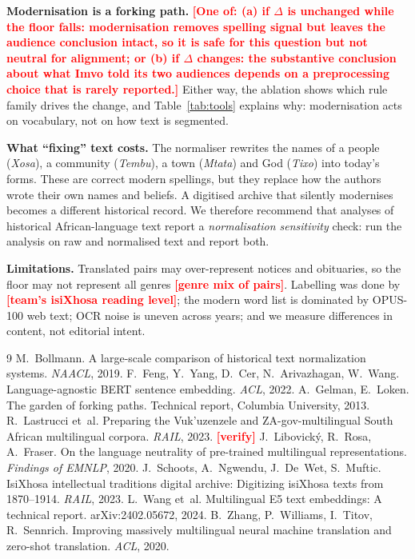 \documentclass[10pt,twocolumn]{article}
\newcommand{\TBD}[1]{\textcolor{red}{\textbf{[#1]}}}
\begin{document}
\textbf{Modernisation is a forking path.} \TBD{One of: (a) if $\Delta$ is unchanged while the floor
falls: modernisation removes spelling signal but leaves the audience conclusion intact, so it is safe
for this question but not neutral for alignment; or (b) if $\Delta$ changes: the substantive conclusion
about what Imvo told its two audiences depends on a preprocessing choice that is rarely reported.}
Either way, the ablation shows which rule family drives the change, and Table~\ref{tab:tools} explains
why: modernisation acts on vocabulary, not on how text is segmented.

\textbf{What ``fixing'' text costs.} The normaliser rewrites the names of a people (\emph{Xosa}), a
community (\emph{Tembu}), a town (\emph{Mtata}) and God (\emph{Tixo}) into today's forms. These are
correct modern spellings, but they replace how the authors wrote their own names and beliefs. A
digitised archive that silently modernises becomes a different historical record. We therefore
recommend that analyses of historical African-language text report a \emph{normalisation sensitivity}
check: run the analysis on raw and normalised text and report both.

\textbf{Limitations.} Translated pairs may over-represent notices and obituaries, so the floor may
not represent all genres \TBD{genre mix of pairs}. Labelling was done by \TBD{team's isiXhosa reading
level}; the modern word list is dominated by OPUS-100 web text; OCR noise is uneven across years; and
we measure differences in content, not editorial intent.

\clearpage
\small
\begin{thebibliography}{9}\setlength{\itemsep}{0pt}
 M.~Bollmann. A large-scale comparison of historical text normalization systems. \emph{NAACL}, 2019.
 F.~Feng, Y.~Yang, D.~Cer, N.~Arivazhagan, W.~Wang. Language-agnostic BERT sentence embedding. \emph{ACL}, 2022.
 A.~Gelman, E.~Loken. The garden of forking paths. Technical report, Columbia University, 2013.
 R.~Lastrucci et~al. Preparing the Vuk'uzenzele and ZA-gov-multilingual South African multilingual corpora. \emph{RAIL}, 2023. \TBD{verify}
 J.~Libovick{\'y}, R.~Rosa, A.~Fraser. On the language neutrality of pre-trained multilingual representations. \emph{Findings of EMNLP}, 2020.
 J.~Schoots, A.~Ngwendu, J.~De~Wet, S.~Muftic. IsiXhosa intellectual traditions digital archive: Digitizing isiXhosa texts from 1870--1914. \emph{RAIL}, 2023.
 L.~Wang et~al. Multilingual E5 text embeddings: A technical report. arXiv:2402.05672, 2024.
 B.~Zhang, P.~Williams, I.~Titov, R.~Sennrich. Improving massively multilingual neural machine translation and zero-shot translation. \emph{ACL}, 2020.
\end{thebibliography}
\end{document}
